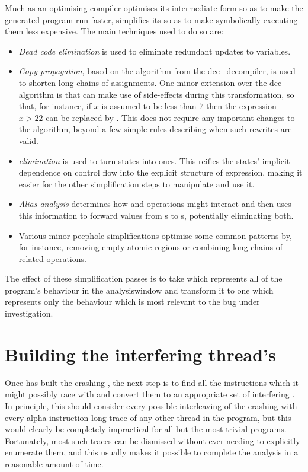 Much as an optimising compiler optimises its intermediate form so as
to make the generated program run faster, {\technique} simplifies its
{\StateMachines} so as to make symbolically executing them less
expensive.  The main techniques used to do so are:
\begin{itemize}
\item \emph{Dead code elimination} is used to eliminate redundant
  updates to {\StateMachine} variables.
\item \emph{Copy propagation}, based on the algorithm from the
  dcc~\cite{Cifuentes1994} decompiler, is used to shorten long chains
  of assignments.  One minor extension over the dcc algorithm is that
  {\technique} can make use of {\stAssertN} side-effects during this
  transformation, so that, for instance, if $x$ is assumed to be less
  than $7$ then the expression $x > 22$ can be replaced by \false.
  This does not require any important changes to the algorithm, beyond
  a few simple rules describing when such rewrites are valid.
\item \emph{{\stPhi} elimination} is used to turn {\stPhi} states into
   ones.  This reifies the {\stPhi} states' implicit
  dependence on {\StateMachine} control flow into the explicit
  structure of {\AStateMachine} expression, making it easier for the
  other simplification steps to manipulate and use it.
\item \emph{Alias analysis} determines how  and
   operations might interact and then uses this
  information to forward values from s to s,
  potentially eliminating both.
\item Various minor peephole simplifications optimise some common
  {\StateMachine} patterns by, for instance, removing empty atomic
  regions or combining long chains of related  operations.
\end{itemize}
The effect of these simplification passes is to take {\AStateMachine}
which represents all of the program's behaviour in the
\gls{analysiswindow} and transform it to one which represents only the
behaviour which is most relevant to the bug under investigation.

\section{Building the interfering thread's \StateMachines}
\label{sect:derive:write_side}

Once {\technique} has built the crashing {\StateMachine}, the next
step is to find all the instructions which it might possibly race with
and convert them to an appropriate set of interfering
{\StateMachines}.  In principle, this should consider every possible
interleaving of the crashing {\StateMachine} with every
\gls{alpha}-instruction long trace of any other thread in the program,
but this would clearly be completely impractical for all but the most
trivial programs.  Fortunately, most such traces can be dismissed
without ever needing to explicitly enumerate them, and this usually
makes it possible to complete the analysis in a reasonable amount of
time.

